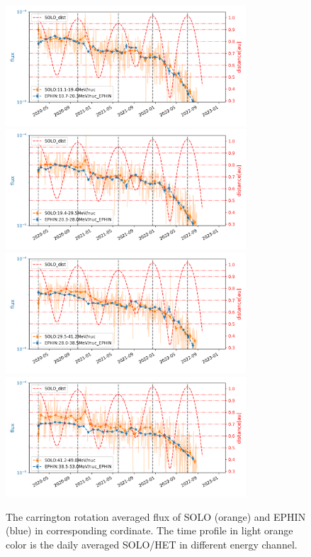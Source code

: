 \begin{figure}
    \centering
    \includegraphics[width = 0.8\textwidth, height = 0.2\textheight]{images/ACR/seperate_mask_1-3/Carrington_SOLO_11.1-19.4MeV_EPHIN_10.7-20.3MeV.png}
    \includegraphics[width = 0.8\textwidth,height = 0.2\textheight]{images/ACR/seperate_mask_1-3/Carrington_SOLO_19.4-29.5MeV_EPHIN_20.3-28.0MeV.png}
    \includegraphics[width = 0.8\textwidth,height = 0.2\textheight]{images/ACR/seperate_mask_1-3/Carrington_SOLO_29.5-41.2MeV_EPHIN_28.0-38.5MeV.png}
    \includegraphics[width = 0.8\textwidth,height = 0.2\textheight]{images/ACR/seperate_mask_1-3/Carrington_SOLO_41.2-49.0MeV_EPHIN_38.5-53.0MeV.png}
    \caption{The carrington rotation averaged flux of SOLO (orange) and EPHIN (blue) in corresponding cordinate. The time profile in light orange color is the daily averaged SOLO/HET in different energy channel.}
    \label{fig:carrington_flux}
\end{figure}

